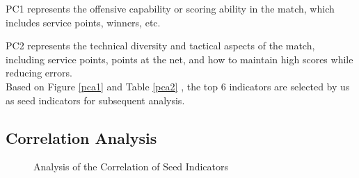 \documentclass[12pt]{article}%
\begin{document}
PC1 represents the offensive capability or scoring ability in the match, which includes service points, winners, etc.

PC2 represents the technical diversity and tactical aspects of the match, including service points, points at the net, and how to maintain high scores while reducing errors. \\

Based on Figure \ref{pca1} and Table \ref{pca2} , the top 6 indicators are selected by us as seed indicators for subsequent analysis.
\subsection{Correlation Analysis}

\begin{figure}[H]
	\centering    
	\caption{Analysis of the Correlation of Seed Indicators}		%
	\label{hot}									%
\end{figure}
\end{document}
